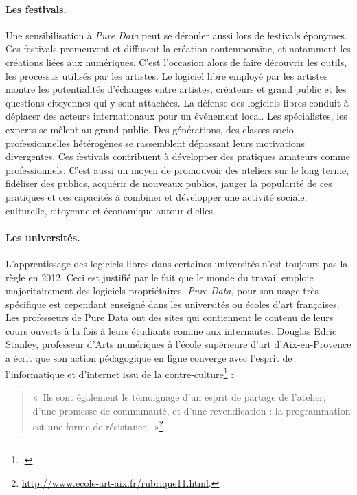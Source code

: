 \documentclass{FramateX}
\begin{document}
\begin{refsection}
\paragraph{Les festivals.}
Une sensibilisation à \textit{Pure Data} peut se dérouler aussi lors de festivals
éponymes. Ces festivals promeuvent et diffusent la création
contemporaine, et notamment les créations liées aux numériques. C'est
l'occasion alors de faire découvrir les outils, les processus utilisés
par les artistes. Le logiciel libre employé par les artistes montre les
potentialités d'échanges entre artistes, créateurs et grand public et
les questions citoyennes qui y sont attachées. La défense des logiciels
libres conduit à déplacer des acteurs internationaux pour un événement
local. Les spécialistes, les experts se mêlent au grand public. Des
générations, des classes socio-professionnelles hétérogènes se
rassemblent dépassant leurs motivations divergentes. Ces festivals
contribuent à développer des pratiques amateurs comme professionnels.
C'est aussi un moyen de promouvoir des ateliers sur le long terme,
fidéliser des publics, acquérir de nouveaux publics, jauger la
popularité de ces pratiques et ces capacités à combiner et développer
une activité sociale, culturelle, citoyenne et économique autour
d'elles.

\paragraph{Les universités.}
L'apprentissage des logiciels libres dans certaines universités n'est
toujours pas la règle en 2012. Ceci est justifié par le fait que le
monde du travail emploie majoritairement des logiciels propriétaires.
\textit{Pure Data}, pour son usage très spécifique est cependant enseigné dans
les universités ou écoles d'art françaises. Les professeurs de Pure
Data ont des sites qui contiennent le contenu de leurs cours ouverts à
la fois à leurs étudiants comme aux internautes. Douglas Edric Stanley,
professeur d'Arts numériques à
l'école supérieure d'art
d'Aix-en-Provence a écrit que son action pédagogique
en ligne converge avec l'esprit de l'informatique et d'internet issu de
la contre-culture\footnote{\cite[pp.~21-26]{Cardon2010}.} : 

\begin{quote}
«~Ils sont également le témoignage d'un esprit de partage de l'atelier,
d'une promesse de communauté, et d'une revendication : la programmation
est une forme de résistance.~»\footnote{\url{http://www.ecole-art-aix.fr/rubrique11.html}.}
\end{quote}


\end{refsection}
\end{document}
